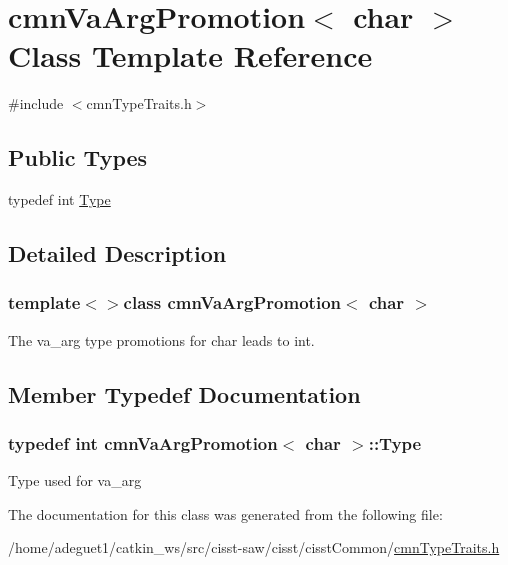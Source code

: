 \hypertarget{classcmn_va_arg_promotion_3_01char_01_4}{\section{cmn\-Va\-Arg\-Promotion$<$ char $>$ Class Template Reference}
\label{classcmn_va_arg_promotion_3_01char_01_4}
}


{\ttfamily \#include $<$cmn\-Type\-Traits.\-h$>$}

\subsection*{Public Types}
\begin{DoxyCompactItemize}
\item 
typedef int \hyperlink{classcmn_va_arg_promotion_3_01char_01_4_a8732ccd3d1cdb55d42d07f96242f3c26}{Type}
\end{DoxyCompactItemize}


\subsection{Detailed Description}
\subsubsection*{template$<$$>$class cmn\-Va\-Arg\-Promotion$<$ char $>$}

The va\-\_\-arg type promotions for char leads to int. 

\subsection{Member Typedef Documentation}
\hypertarget{classcmn_va_arg_promotion_3_01char_01_4_a8732ccd3d1cdb55d42d07f96242f3c26}{
\subsubsection[{Type}]{\setlength{\rightskip}{0pt plus 5cm}typedef int {\bf cmn\-Va\-Arg\-Promotion}$<$ char $>$\-::{\bf Type}}}\label{classcmn_va_arg_promotion_3_01char_01_4_a8732ccd3d1cdb55d42d07f96242f3c26}
Type used for va\-\_\-arg 

The documentation for this class was generated from the following file\-:\begin{DoxyCompactItemize}
\item 
/home/adeguet1/catkin\-\_\-ws/src/cisst-\/saw/cisst/cisst\-Common/\hyperlink{cmn_type_traits_8h}{cmn\-Type\-Traits.\-h}\end{DoxyCompactItemize}
